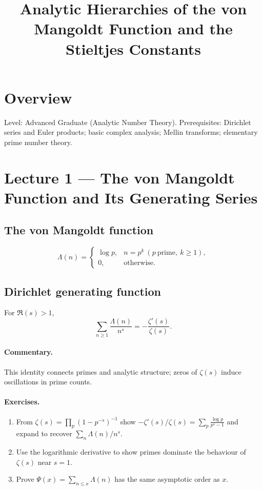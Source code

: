 \documentclass[11pt]{article}
\title{Analytic Hierarchies of the von Mangoldt Function and the Stieltjes Constants}
\author{}
\date{}
\newcommand{\LM}{\Lambda}
\newcommand{\z}{\zeta}
\begin{document}
\maketitle

\section*{Overview}
Level: Advanced Graduate (Analytic Number Theory). Prerequisites: Dirichlet series and Euler products; basic complex analysis; Mellin transforms; elementary prime number theory.

\section{Lecture 1 --- The von Mangoldt Function and Its Generating Series}
\subsection{The von Mangoldt function}
\[
\LM(n)=
\begin{cases}
\log p,& n=p^k\ (p\ \text{prime},\ k\ge1),\\[4pt]
0,&\text{otherwise}.
\end{cases}
\]

\subsection{Dirichlet generating function}
For $\Re(s)>1$,
\[
\sum_{n\ge1}\frac{\LM(n)}{n^s}=-\frac{\z'(s)}{\z(s)}.
\]

\paragraph{Commentary.} This identity connects primes and analytic structure; zeros of $\z(s)$ induce oscillations in prime counts.

\paragraph{Exercises.}
\begin{enumerate}
\item From $\z(s)=\prod_p(1-p^{-s})^{-1}$ show $-\z'(s)/\z(s)=\sum_p\frac{\log p}{p^s-1}$ and expand to recover $\sum_n \LM(n)/n^s$.
\item Use the logarithmic derivative to show primes dominate the behaviour of $\z(s)$ near $s=1$.
\item Prove $\Psi(x)=\sum_{n\le x}\LM(n)$ has the same asymptotic order as $x$.
\end{enumerate}
\end{document}
